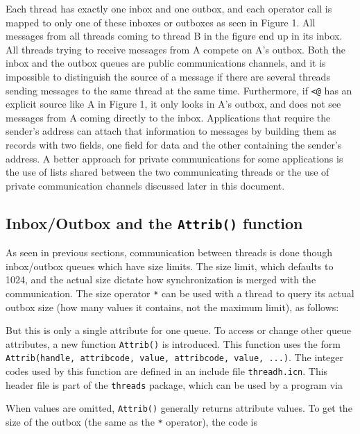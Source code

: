 Each thread has exactly one inbox and one outbox, and each operator call is
mapped to only one of these inboxes or outboxes as seen in Figure 1.  All
messages from all threads coming to thread B in the figure end up in its
inbox. All threads trying to receive messages from A compete on A's outbox. Both
the inbox and the outbox queues are public communications channels, and it is
impossible to distinguish the source of a message if there are several threads
sending messages to the same thread at the same time. Furthermore, if
\texttt{{<}@} has an explicit source like A in Figure 1, it only looks in A's
outbox, and does not see messages from A coming directly to the
inbox. Applications that require the sender's address can attach that
information to messages by building them as records with two fields, one field
for data and the other containing the sender's address. A better approach for
private communications for some applications is the use of lists shared between
the two communicating threads or the use of private communication channels
discussed later in this document.


\subsection*{Inbox/Outbox and the \texttt{Attrib()} function}

As seen in previous sections, communication between threads is done though
inbox/outbox queues which have size limits. The size limit, which defaults to
1024, and the actual size dictate how synchronization is merged with the
communication. The size operator \texttt{*} can be used with a thread to query
its actual outbox size (how many values it contains, not the maximum limit), as
follows:


But this is only a single attribute for one queue.  To access or change other
queue attributes, a new function \texttt{Attrib()} is introduced.  This function
uses the form \texttt{Attrib(handle, attribcode, value, attribcode, value,
  ...)}. The integer codes used by this function are defined in an include file
\texttt{threadh.icn}. This header file is part of the \texttt{threads} package,
which can be used by a program via


When values are omitted, \texttt{Attrib()} generally returns attribute
values. To get the size of the outbox (the same as the \texttt{*} operator), the
code is

